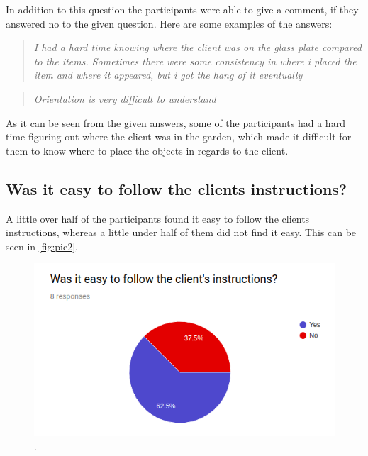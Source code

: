 In addition to this question the participants were able to give a comment, if they answered no to the given question. Here are some examples of the answers:\\

 \begin{quote}
 	
 	\textit{I had a hard time knowing where the client was on the glass plate compared to the items. Sometimes there were some consistency in where i placed the item and where it appeared, but i got the hang of it eventually}\\
  \end{quote}
  
  \begin{quote}
  \textit{Orientation is very difficult to understand}\\
  \end{quote}	
 	 
 	As it can be seen from the given answers, some of the participants had a hard time figuring out where the client was in the garden, which made it difficult for them to know where to place the objects in regards to the client.
 

\subsection*{Was it easy to follow the clients instructions?}
A little over half of the participants found it easy to follow the clients instructions, whereas a little under half of them did not find it easy. This can be seen in \autoref{fig:pie2}.

\begin{figure}[H]
	\centering
	\includegraphics[width=0.9\linewidth]{figure/Evaluation/pie2.png}
	\caption{.}
	\label{fig:pie2}
\end{figure}

